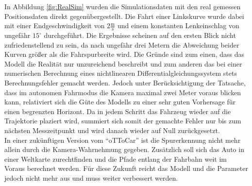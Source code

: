 In Abbildung \ref{fig:RealSim} wurden die Simulationsdaten mit den real gemessen Positionsdaten direkt gegenübergestellt. Die Fahrt einer Linkskurve wurde dabei mit einer Endgeschwindigkeit von $2\frac{\text{m}}{\text{s}}$ und einem konstanten Lenkeinschlag von ungefähr $15^\circ$ durchgeführt. Die Ergebnisse scheinen auf den ersten Blick nicht zufriedenstellend zu sein, da nach ungefähr drei Metern die Abweichung beider Kurven größer als die Fahrspurbreite wird. Die Gründe sind zum einen, dass das Modell die Realität nur unzureichend beschreibt und zum anderen das bei einer numerischen Berechnung eines nichtlinearen Differentialgleichungssystem stets Berechnungsfehler gemacht werden. Jedoch unter Berücksichtigung der Tatsache, dass im autonomen Fahrmodus die Kamera maximal zwei Meter voraus blicken kann, relativiert sich die Güte des Modells zu einer sehr guten Vorhersage für einen begrenzten Horizont. Da in jedem Schritt das Fahrzeug wieder auf die Trajektorie plaziert wird, summiert sich somit der gemachte Fehler nur bis zum nächsten Messzeitpunkt und wird danach wieder auf Null zurückgesetzt. \\
In einer zukünftigen Version vom "`oTToCar"' ist die Spurerkennung nicht mehr allein durch die Kamera-Wahrnehmung gegeben. Zusätzlich soll sich das Auto in einer Weltkarte zurechtfinden und die Pfade entlang der Fahrbahn weit im Voraus berechnet werden. Für diese Zukunft reicht das Modell und die Parameter jedoch nicht mehr aus und muss weiter verbessert werden.